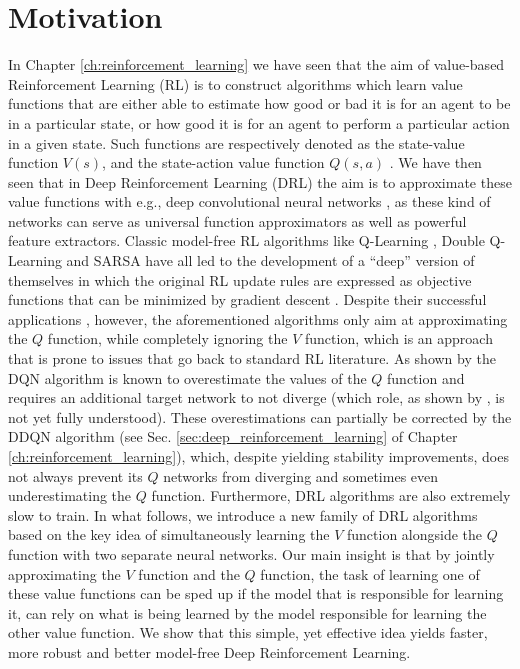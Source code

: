 \section{Motivation}
\label{sec:ijcnn_introduction}

In Chapter \ref{ch:reinforcement_learning} we have seen that the aim of value-based Reinforcement Learning (RL) is to construct algorithms which learn value functions that are either able to estimate how good or bad it is for an agent to be in a particular state, or how good it is for an agent to perform a particular action in a given state. Such functions are respectively denoted as the state-value function $V(s)$, and the state-action value function $Q(s,a)$ \cite{sutton2018reinforcement}. We have then seen that in Deep Reinforcement Learning (DRL) the aim is to approximate these value functions with e.g., deep convolutional neural networks \cite{lecun2015deep}, as these kind of networks can serve as universal function approximators as well as powerful feature extractors. Classic model-free RL algorithms like Q-Learning \cite{watkins1992q}, Double Q-Learning \cite{hasselt2010double} and SARSA \cite{rummery1994line} have all led to the development of a ``deep'' version of themselves in which the original RL update rules are expressed as objective functions that can be minimized by gradient descent \cite{mnih2015human, van2016deep, zhao2016deep}. Despite their successful applications \cite{li2017deep}, however, the aforementioned algorithms only aim at approximating the $Q$ function, while completely ignoring the $V$ function, which is an approach that is prone to issues that go back to standard RL literature. As shown by \citet{van2016deep} the DQN algorithm \cite{mnih2015human} is known to overestimate the values of the $Q$ function and requires an additional target network to not diverge (which role, as shown by \citet{achiam2019towards}, is not yet fully understood). These overestimations can partially be corrected by the DDQN \cite{van2016deep} algorithm (see Sec. \ref{sec:deep_reinforcement_learning} of Chapter \ref{ch:reinforcement_learning}), which, despite yielding stability improvements, does not always prevent its $Q$ networks from diverging \cite{van2018deep_triad} and sometimes even underestimating the $Q$ function. Furthermore, DRL algorithms are also extremely slow to train. In what follows, we introduce a new family of DRL algorithms based on the key idea of simultaneously learning the $V$ function alongside the $Q$ function with two separate neural networks. Our main insight is that by jointly approximating the $V$ function and the $Q$ function, the task of learning one of these value functions can be sped up if the model that is responsible for learning it, can rely on what is being learned by the model responsible for learning the other value function. We show that this simple, yet effective idea yields faster, more robust and better model-free Deep Reinforcement Learning.


